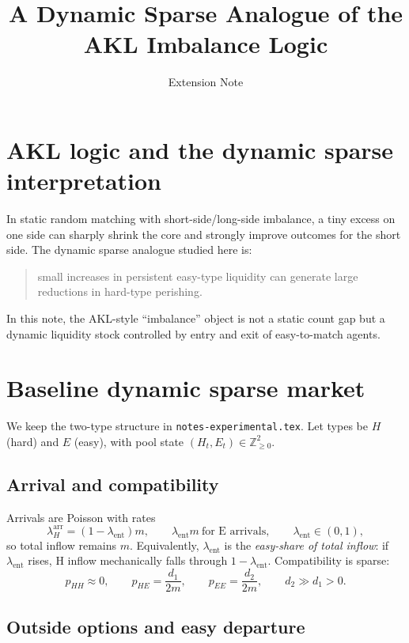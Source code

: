 \documentclass{article}
\title{A Dynamic Sparse Analogue of the AKL Imbalance Logic}
\author{Extension Note}
\date{}
\begin{document}
\maketitle

\section{AKL logic and the dynamic sparse interpretation}

In static random matching with short-side/long-side imbalance, a tiny excess on one side can sharply shrink the core and strongly improve outcomes for the short side. The dynamic sparse analogue studied here is:
\begin{quote}
small increases in persistent easy-type liquidity can generate large reductions in hard-type perishing.
\end{quote}

In this note, the AKL-style ``imbalance'' object is not a static count gap but a dynamic liquidity stock controlled by entry and exit of easy-to-match agents.

\section{Baseline dynamic sparse market}

We keep the two-type structure in \texttt{notes-experimental.tex}. Let types be \(H\) (hard) and \(E\) (easy), with pool state \((H_t,E_t)\in\mathbb{Z}_{\ge 0}^2\).

\subsection{Arrival and compatibility}

Arrivals are Poisson with rates
\[
\lambda_H^{\mathrm{arr}}=(1-\lambda_{\mathrm{ent}})m,\qquad
\lambda_{\mathrm{ent}}m\ \text{for E arrivals},\qquad
\lambda_{\mathrm{ent}}\in(0,1),
\]
so total inflow remains \(m\). Equivalently, \(\lambda_{\mathrm{ent}}\) is the \emph{easy-share of total inflow}: if \(\lambda_{\mathrm{ent}}\) rises, H inflow mechanically falls through \(1-\lambda_{\mathrm{ent}}\). Compatibility is sparse:
\[
p_{HH}\approx 0,\qquad
p_{HE}=\frac{d_1}{2m},\qquad
p_{EE}=\frac{d_2}{2m},\qquad d_2\gg d_1>0.
\]

\subsection{Outside options and easy departure}
\end{document}
